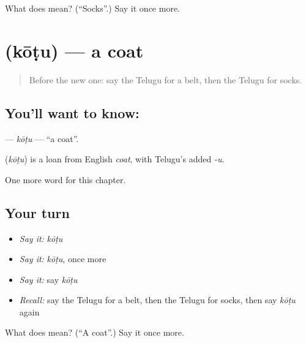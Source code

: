 \begin{tcolorbox}[breakable,colback=teal!4,colframe=teal!35!black,title={Before you move on}]
What does  mean? (\textquotedblleft{}Socks\textquotedblright{}.) Say it once more.
\end{tcolorbox}
\section[\texorpdfstring{\te{కోటు} (kōṭu)}{కోటు (kōṭu)}]{ (kōṭu) — a coat}

\label{lesson:TE-C132-kotu}



\begin{quote}
Before the new one: say the Telugu for a belt, then the Telugu for socks.
\end{quote}

\subsection*{You'll want to know: }
\textbf{} — \emph{kōṭu} — \textquotedblleft{}a coat\textquotedblright{}.

\begin{cousinweb}
\textbf{} (\emph{kōṭu}) is a loan from English \emph{coat}, with Telugu's added \emph{-u}.
\end{cousinweb}

\begin{grammarlens}[title={What you've built}]
One more word for this chapter.
\end{grammarlens}

\subsection*{Your turn}
\begin{itemize}
\raggedright
  \item \emph{Say it:} \emph{kōṭu}
  \item \emph{Say it:} \emph{kōṭu}, once more
  \item \emph{Say it:} say \emph{kōṭu}
  \item \emph{Recall:} say the Telugu for a belt, then the Telugu for socks, then say \emph{kōṭu} again
\end{itemize}

\begin{tcolorbox}[breakable,colback=teal!4,colframe=teal!35!black,title={Before you move on}]
What does  mean? (\textquotedblleft{}A coat\textquotedblright{}.) Say it once more.
\end{tcolorbox}
